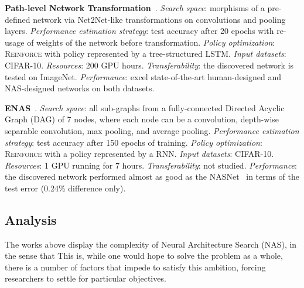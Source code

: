 \textbf{Path-level Network Transformation}~\citep{PathNAS}. \emph{Search space}: morphisms of a pre-defined network via Net2Net-like transformations on convolutions and pooling layers. \emph{Performance estimation strategy}: test accuracy after 20 epochs with re-usage of weights of the network before transformation. \emph{Policy optimization}: \textsc{Reinforce} with policy represented by a tree-structured LSTM. \emph{Input datasets}: CIFAR-10. \emph{Resources}: 200 GPU hours. \emph{Transferability}: the discovered network is tested on ImageNet. \emph{Performance}: excel state-of-the-art human-designed and NAS-designed networks on both datasets.

\textbf{ENAS}~\citep{ENAS}. \emph{Search space}: all sub-graphs from a fully-connected Directed Acyclic Graph (DAG) of 7 nodes, where each node can be a convolution, depth-wise separable convolution, max pooling, and average pooling. \emph{Performance estimation strategy}: test accuracy after 150 epochs of training. \emph{Policy optimization}: \textsc{Reinforce} with a policy represented by a RNN. \emph{Input datasets}: CIFAR-10. \emph{Resources}: 1 GPU running for 7 hours. \emph{Transferability}: not studied. \emph{Performance}: the discovered network performed almost as good as the NASNet~\citep{ZophNAS2} in terms of the test error (0.24\% difference only).


\subsection{Analysis}\label{sec:related:analysis}

The works above display the complexity of Neural Architecture Search (NAS), in the sense that  This is, while one would hope to solve the problem as a whole, there is a number of factors that impede to satisfy this ambition, forcing researchers to settle for particular objectives.

